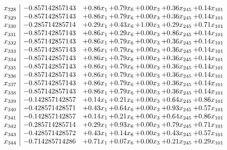 \documentclass[8pt]{article}
\begin{document}
\[\begin{array}{c| c c@{\hskip 2pt} c@{\hskip 2pt} c@{\hskip 2pt} c@{\hskip 2pt} c@{\hskip 2pt} }
 x_{328}   &  -0.857142857143 & +  0.86 x_{1} & +  0.79 x_{6} & +  0.00 x_{3} & +  0.36 x_{245} & +  0.14 x_{101}\\
 x_{329}   &  -0.857142857143 & +  0.86 x_{1} & +  0.79 x_{6} & +  0.00 x_{3} & +  0.36 x_{245} & +  0.14 x_{101}\\
 x_{330}   &  -0.285714285714 & +  0.29 x_{1} & +  0.43 x_{6} & +  1.00 x_{3} & +  0.29 x_{245} & +  0.71 x_{101}\\
 x_{331}   &  -0.857142857143 & +  0.86 x_{1} & +  0.29 x_{6} & +  0.00 x_{3} & +  0.86 x_{245} & +  0.14 x_{101}\\
 x_{332}   &  -0.857142857143 & +  0.86 x_{1} & +  0.79 x_{6} & +  0.00 x_{3} & +  0.36 x_{245} & +  0.14 x_{101}\\
 x_{333}   &  -0.857142857143 & +  0.86 x_{1} & +  0.79 x_{6} & +  0.00 x_{3} & +  0.36 x_{245} & +  0.14 x_{101}\\
 x_{334}   &  -0.857142857143 & +  0.86 x_{1} & +  0.79 x_{6} & +  0.00 x_{3} & +  0.36 x_{245} & +  0.14 x_{101}\\
 x_{335}   &  -0.857142857143 & +  0.86 x_{1} & +  0.79 x_{6} & +  0.00 x_{3} & +  0.36 x_{245} & +  0.14 x_{101}\\
 x_{336}   &  -0.857142857143 & +  0.86 x_{1} & +  0.79 x_{6} & +  0.00 x_{3} & +  0.36 x_{245} & +  0.14 x_{101}\\
 x_{337}   &  -0.857142857143 & +  0.86 x_{1} & +  0.79 x_{6} & +  0.00 x_{3} & +  0.36 x_{245} & +  0.14 x_{101}\\
 x_{338}   &  -0.857142857143 & +  0.86 x_{1} & +  0.79 x_{6} & +  0.00 x_{3} & +  0.36 x_{245} & +  0.14 x_{101}\\
 x_{339}   &  -0.142857142857 & +  0.14 x_{1} & +  0.21 x_{6} & +  0.00 x_{3} & +  0.64 x_{245} & +  0.86 x_{101}\\
 x_{340}   &  -0.428571428571 & +  0.43 x_{1} & +  0.64 x_{6} & +  0.00 x_{3} & +  0.93 x_{245} & +  0.57 x_{101}\\
 x_{341}   &  -0.142857142857 & +  0.14 x_{1} & +  0.21 x_{6} & +  0.00 x_{3} & +  0.64 x_{245} & +  0.86 x_{101}\\
 x_{342}   &  -0.285714285714 & +  0.29 x_{1} & +  0.93 x_{6} & +  0.00 x_{3} & +  0.79 x_{245} & +  0.71 x_{101}\\
 x_{343}   &  -0.428571428572 & +  0.43 x_{1} & +  0.14 x_{6} & +  0.00 x_{3} & +  0.43 x_{245} & +  0.57 x_{101}\\
 x_{344}   &  -0.714285714286 & +  0.71 x_{1} & +  0.07 x_{6} & +  0.00 x_{3} & +  0.21 x_{245} & +  0.29 x_{101}\\

\end{array}\]
\end{document}
